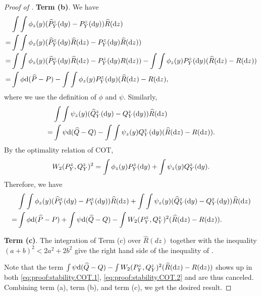 \documentclass{article}
\theoremstyle{plain}
\theoremstyle{definition}
\def\PP{P}
\def\QQ{Q}
\theoremstyle{plain}
\newcommand{\diff}{{\rm d}}
\begin{document}
\begin{proof}[Proof of ]
\textbf{Term (b)}. We have
    \begin{align*}
        &\int \int \phi_z(y) (\widehat \PP_Y^z(\diff y) - P_Y^z(\diff y)) \widehat R(\diff z) \\
        =& \int \int \phi_z(y) (\widehat \PP_Y^z(\diff y) \widehat R(\diff z) - P_Y^z(\diff y) \widehat R(\diff z))\\
        =& \int \int \phi_z(y) (\widehat \PP_Y^z(\diff y) \widehat R(\diff z) - P_Y^z(\diff y) R(\diff z)) - \int \int \phi_z(y) P_Y^z(\diff y) (\widehat R(\diff z) - R(\diff z))\\
        =& \int \phi \diff (\widehat \PP - \PP) - \int \int \phi_z(y) P_Y^z(\diff y) (\widehat R(\diff z) - R(\diff z),
    \end{align*}
    where we use the definition of $\phi$ and $\psi$.
    Similarly,
    \begin{align*}
        &\int \int \psi_z(y) (\widehat \QQ_Y^z(\diff y) - \QQ_Y^z(\diff y)) \widehat R(\diff z) \\
        =& \int \psi \diff (\widehat \QQ - \QQ) - \int \int \psi_z(y) \QQ_Y^z(\diff y) (\widehat R(\diff z) - R(\diff z)).
    \end{align*}
    By the optimality relation of COT,
    \begin{align*}        
        W_2(\PP_Y^{z},\QQ_Y^z)^2 = \int \phi_z(y) \PP_Y^z(\diff y) + \int \psi_z(y) \QQ_Y^z(\diff y).
    \end{align*}
    Therefore, we have
    \begin{align}\label{eq:proof:stability.COT.2}
    \begin{split}
        &\int \int \phi_z(y) (\widehat \PP_Y^z(\diff y) - \PP_Y^z(\diff y)) \widehat R(\diff z)  + \int \int \psi_z(y) (\widehat \QQ_Y^z(\diff y) - \QQ_Y^z(\diff y)) \widehat R(\diff z) \\
        =& \int \phi \diff (\widehat \PP - \PP)  + \int \psi \diff (\widehat \QQ - \QQ) - \int W_2(\PP_Y^z, \QQ_Y^z)^2  (\widehat R(\diff z) - R(\diff z)).
        \end{split}
    \end{align}

\textbf{Term (c)}. The integration of Term (c) over $\widehat{R}(dz)$ together with the inequality $(a+b)^2 < 2a^2+2b^2$ give the right hand side of the inequality of .

Note that the term $\int \psi \diff (\widehat \QQ - \QQ) - \int W_2(\PP_Y^z, \QQ_Y^z)^2  (\widehat R(\diff z) - R(\diff z))$ shows up in both \eqref{eq:proof:stability.COT.1}, \eqref{eq:proof:stability.COT.2} and are thus canceled.
Combining term (a), term (b), and term (c), we get the desired result.
\end{proof}
\end{document}
